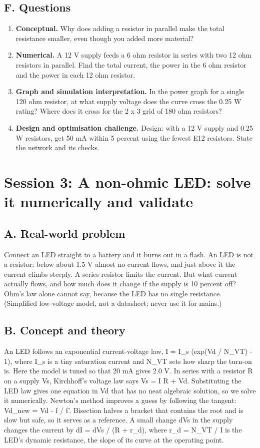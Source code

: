 \documentclass[11pt,a4paper]{article}
\begin{document}
\subsection*{F. Questions}
\begin{enumerate}[nosep]
\item \textbf{Conceptual.} Why does adding a resistor in parallel make the total resistance smaller, even though you added more material?
\item \textbf{Numerical.} A 12 V supply feeds a 6 ohm resistor in series with two 12 ohm resistors in parallel. Find the total current, the power in the 6 ohm resistor and the power in each 12 ohm resistor.
\item \textbf{Graph and simulation interpretation.} In the power graph for a single 120 ohm resistor, at what supply voltage does the curve cross the 0.25 W rating? Where does it cross for the 2 x 3 grid of 180 ohm resistors?
\item \textbf{Design and optimisation challenge.} Design: with a 12 V supply and 0.25 W resistors, get 50 mA within 5 percent using the fewest E12 resistors. State the network and its checks.
\end{enumerate}

\section{Session 3: A non-ohmic LED: solve it numerically and validate}

\subsection*{A. Real-world problem}
Connect an LED straight to a battery and it burns out in a flash. An LED is not a resistor: below about 1.5 V almost no current flows, and just above it the current climbs steeply. A series resistor limits the current. But what current actually flows, and how much does it change if the supply is 10 percent off? Ohm's law alone cannot say, because the LED has no single resistance. (Simplified low-voltage model, not a datasheet; never use it for mains.)

\subsection*{B. Concept and theory}
An LED follows an exponential current-voltage law, I = I\_s (exp(Vd / N\_VT) - 1), where I\_s is a tiny saturation current and N\_VT sets how sharp the turn-on is. Here the model is tuned so that 20 mA gives 2.0 V. In series with a resistor R on a supply Vs, Kirchhoff's voltage law says Vs = I R + Vd. Substituting the LED law gives one equation in Vd that has no neat algebraic solution, so we solve it numerically. Newton's method improves a guess by following the tangent: Vd\_new = Vd - f / f'. Bisection halves a bracket that contains the root and is slow but safe, so it serves as a reference. A small change dVs in the supply changes the current by dI = dVs / (R + r\_d), where r\_d = N\_VT / I is the LED's dynamic resistance, the slope of its curve at the operating point.
\end{document}
